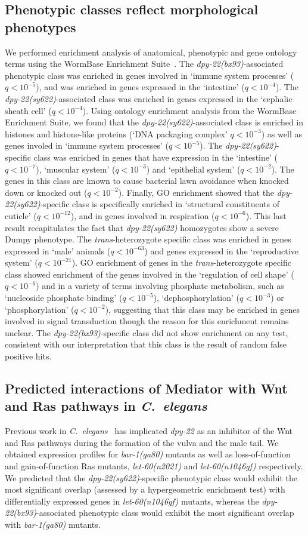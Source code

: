 \documentclass[9pt,twocolumn,twoside]{gsajnl}
\newcommand{\qval}[1]{$q<10^{-#1}$}
\newcommand{\cel}{\emph{C.~elegans}}
\newcommand{\gene}[1]{\mbox{\emph{#1}}}
\newcommand{\dpy}[1]{\gene{dpy-22#1}}
\newcommand{\bx}{\dpy{(bx93)}}
\newcommand{\sy}{\dpy{(sy622)}}
\begin{document}
\subsection*{Phenotypic classes reflect morphological phenotypes}
We performed enrichment analysis of anatomical, phenotypic and gene ontology
terms using the WormBase Enrichment Suite~\citep{Angeles-Albores2016,
Angeles-Albores2018}. The \bx{}-associated phenotypic class was enriched in
genes involved in `immune system processes' (\qval{5}), and was enriched in
genes expressed in the `intestine' (\qval{4}). The \sy{}-associated
class was enriched in genes expressed in the `cephalic sheath
cell' (\qval{4}). Using ontology enrichment analysis from the WormBase
Enrichment Suite, we found that the \sy{}-associated class is enriched in
histones and histone-like proteins (`DNA packaging complex' \qval{3}) as well as
genes involed in `immune system processes' (\qval{5}). The \sy{}-specific class
was enriched in genes that have expression in the `intestine' (\qval{7}),
`muscular system' (\qval{3}) and `epithelial system' (\qval{2}). The genes in
this class are known to cause bacterial lawn avoidance when knocked down or
knocked out (\qval{2}). Finally, GO enrichment showed that the \sy{}-specific
class is specifically enriched in `structural constituents of cuticle'
(\qval{12}), and in genes involved in respiration (\qval{6}). This last result
recapitulates the fact that \sy{} homozygotes show a severe Dumpy phenotype. The
\emph{trans}-heterozygote specific class was enriched in genes expressed in
`male' animals (\qval{63}) and genes expressed in the `reproductive system'
(\qval{21}). GO enrichment of genes in the \emph{trans}-heterozygote specific
class showed enrichment of the genes involved in the `regulation of cell shape'
(\qval{6}) and in a variety of terms involving phosphate metabolism, such as
`nucleoside phosphate binding' (\qval{5}), `dephosphorylation' (\qval{3}) or
`phosphorylation' (\qval{2}), suggesting that this class may be enriched in
genes involved in signal transduction though the reason for this enrichment
remains unclear. The \bx{}-specific class did not show enrichment on any test,
consistent with our interpretation that this class is the result of random false
positive hits.

\subsection*{Predicted interactions of Mediator with Wnt and Ras pathways in
          \cel{}}
Previous work in \cel{}~\citep{Moghal2003,Zhang2000} has implicated \dpy{} as an
inhibitor of the Wnt and Ras pathways during the formation of the vulva and the
male tail. We obtained expression profiles for \gene{bar-1(ga80)} mutants as
well as loss-of-function and gain-of-function Ras mutants, \gene{let-60(n2021)}
and \gene{let-60(n1046gf)} respectively. We predicted that the \sy{}-specific
phenotypic class would exhibit the most significant overlap (assessed by a
hypergeometric enrichment test) with differentially expressed genes in
\gene{let-60(n1046gf)} mutants, whereas the \bx{}-associated phenotypic class
would exhibit the most significant overlap with \gene{bar-1(ga80)} mutants.
\end{document}
